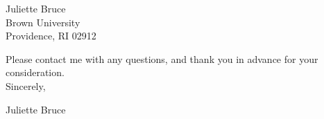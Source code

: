 \documentclass[11pt]{brownletter}
\begin{document}
\begin{letter}{Juliette Bruce\\ 
               Brown University\\ 
               Providence, RI 02912}
\begin{itemize}
\end{itemize}

Please contact me with any questions, and thank you in advance for your consideration.
\vspace{.1 in}
\\
Sincerely,
\\ \vspace{.1 in}

Juliette Bruce




\end{letter}
\end{document}

